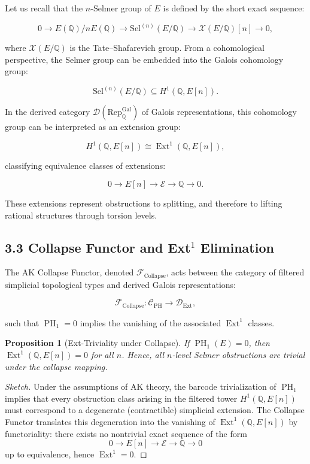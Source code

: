 \documentclass[11pt]{article}
\newtheorem{proposition}[theorem]{Proposition}
\DeclareMathOperator{\Ext}{Ext}
\DeclareMathOperator{\PH}{PH}
\newcommand{\QQ}{\mathbb{Q}}
\newcommand{\Sha}{\mathcal{X}}
\begin{document}
Let us recall that the $n$-Selmer group of $E$ is defined by the short exact sequence:

\[
0 \to E(\QQ)/nE(\QQ) \to \mathrm{Sel}^{(n)}(E/\QQ) \to \Sha(E/\QQ)[n] \to 0,
\]

where $\Sha(E/\QQ)$ is the Tate–Shafarevich group.  
From a cohomological perspective, the Selmer group can be embedded into the Galois cohomology group:

\[
\mathrm{Sel}^{(n)}(E/\QQ) \subseteq H^1(\QQ,E[n]).
\]

In the derived category $\mathcal{D}(\mathrm{Rep}_{\QQ}^{\text{Gal}})$ of Galois representations, this cohomology group can be interpreted as an extension group:

\[
H^1(\QQ,E[n]) \cong \Ext^1(\QQ,E[n]),
\]

classifying equivalence classes of extensions:

\[
0 \to E[n] \to \mathcal{E} \to \QQ \to 0.
\]

These extensions represent obstructions to splitting, and therefore to lifting rational structures through torsion levels.

\subsection{3.3 Collapse Functor and Ext$^1$ Elimination}

The AK Collapse Functor, denoted $\mathcal{F}_{\mathrm{Collapse}}$, acts between the category of filtered simplicial topological types and derived Galois representations:

\[
\mathcal{F}_{\mathrm{Collapse}}: \mathcal{C}_{\mathrm{PH}} \to \mathcal{D}_{\mathrm{Ext}},
\]

such that $\PH_1 = 0$ implies the vanishing of the associated $\Ext^1$ classes.

\begin{proposition}[Ext-Triviality under Collapse]
\label{prop:ext-collapse}
If $\PH_1(E) = 0$, then $\Ext^1(\QQ,E[n]) = 0$ for all $n$.  
Hence, all $n$-level Selmer obstructions are trivial under the collapse mapping.
\end{proposition}

\begin{proof}[Sketch]
Under the assumptions of AK theory, the barcode trivialization of $\PH_1$ implies that every obstruction class arising in the filtered tower $H^1(\QQ,E[n])$ must correspond to a degenerate (contractible) simplicial extension.  
The Collapse Functor translates this degeneration into the vanishing of $\Ext^1(\QQ,E[n])$ by functoriality: there exists no nontrivial exact sequence of the form
\[
0 \to E[n] \to \mathcal{E} \to \QQ \to 0
\]
up to equivalence, hence $\Ext^1 = 0$.
\end{proof}
\end{document}
